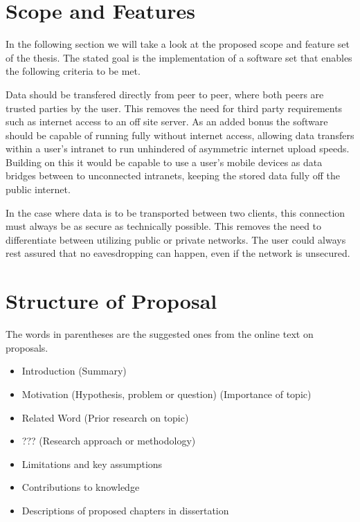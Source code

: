 \documentclass[a4paper,10pt,twoside]{article}
\begin{document}
\section{Scope and Features}

In the following section we will take a look at the proposed scope and feature set of the thesis.
The stated goal is the implementation of a software set that enables the following criteria to be met.

\begin{description}[leftmargin=2em,style=nextline,noitemsep,nolistsep]
\item[Peer to peer]
	Data should be transfered directly from peer to peer, where both peers are trusted parties by the user.
	This removes the need for third party requirements such as internet access to an off site server.
	As an added bonus the software should be capable of running fully without internet access, allowing data transfers within a user's intranet to run unhindered of asymmetric internet upload speeds.
	Building on this it would be capable to use a user's mobile devices as data bridges between to unconnected intranets, keeping the stored data fully off the public internet.
\item[Secure transport]
	In the case where data is to be transported between two clients, this connection must always be as secure as technically possible.
	This removes the need to differentiate between utilizing public or private networks.
	The user could always rest assured that no eavesdropping can happen, even if the network is unsecured.
\item[Focus on ease of use]
\item[Encrypted third party capability]
\end{description}

\section{Structure of Proposal}

The words in parentheses are the suggested ones from the online text on proposals.

\begin{itemize}
\item Introduction (Summary)
\item Motivation (Hypothesis, problem or question) (Importance of topic)
\item Related Word (Prior research on topic)
\item ??? (Research approach or methodology)
\item Limitations and key assumptions
\item Contributions to knowledge
\item Descriptions of proposed chapters in dissertation
\end{itemize}

{\small %

}
\end{document}
